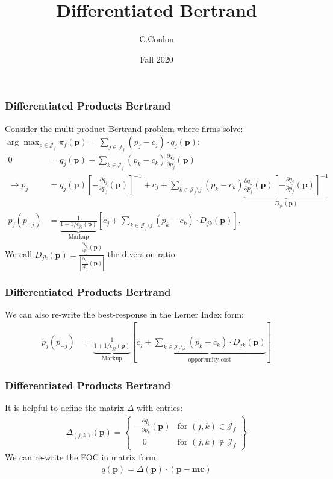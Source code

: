 \documentclass[xcolor=pdftex,dvipsnames,table,mathserif,aspectratio=169]{beamer}
\title{Differentiated Bertrand}
\author{C.Conlon}
\institute{Grad IO }
\date{Fall 2020}
\begin{document}
\frame{\titlepage}

\begin{frame}
\frametitle{Differentiated Products Bertrand}
\small
Consider the multi-product Bertrand problem where firms solve: $\arg \max_{p \in \mathcal{J}_f} \pi_f (\mathbf{p}) = \sum_{j \in \mathcal{J}_f} (p_j - c_j) \cdot q_j(\mathbf{p})$:
\begin{align*}
 0&= q_j(\mathbf{p}) + \sum_{k \in \mathcal{J}_f} (p_k - c_k) \frac{\partial q_{k}}{\partial p_j}(\mathbf{p}) \\
\rightarrow p_j &=q_{j}(\mathbf{p}) \left[-\frac{\partial q_{j}}{\partial p_{j}}(\mathbf{p})\right]^{-1} + c_{j} + \sum_{k \in \mathcal{J}_{f} \setminus j} \left(p_{k}-c_{k}\right) \underbrace{\frac{\partial q_{k}}{\partial p_{j}}(\mathbf{p})\left[-\frac{\partial q_{j}}{\partial p_{j}}(\mathbf{p})\right]^{-1}}_{D_{jk}(\mathbf{p})}\\
p_j(p_{-j}) &= \underbrace{\frac{1}{1+1/\epsilon_{jj}(\mathbf{p})}}_{\text{Markup}} \left[ c_j + \sum_{k \in \mathcal{J}_{f} \setminus j}  (p_k-c_k) \cdot  D_{jk} (\mathbf{p}) \right].
\end{align*}
We call $D_{jk}(\mathbf{p}) = \frac{\frac{\partial q_{k}}{\partial p_j}(\mathbf{p})}{\left| \frac{\partial q_{j}}{\partial p_j}(\mathbf{p}) \right|}$ the \alert{diversion ratio}.
\end{frame}

\begin{frame}
\frametitle{Differentiated Products Bertrand}
We can also re-write the best-response in the Lerner Index form:
\begin{align*}
p_j(p_{-j}) &= \underbrace{\frac{1}{1+1/\epsilon_{jj}(\mathbf{p})}}_{\text{Markup}} \left[c_j + \underbrace{\sum_{k \in \mathcal{J}_{f} \setminus j}  (p_k-c_k) \cdot  D_{jk} (\mathbf{p}) }_{\text{opportunity cost}}\right]
\end{align*}

\end{frame}


\begin{frame}
\frametitle{Differentiated Products Bertrand}
It is helpful to define the matrix $\Delta$ with entries:
\begin{eqnarray*}
\Delta_{(j,k)}(\mathbf{p}) = \left\{\begin{array}{lr}
         - \frac{\partial q_{j}}{\partial p_k}(\mathbf{p}) & \text{for }  (j,k) \in \mathcal{J}_f\\
       	  \quad 0 & \text{for } (j,k) \notin \mathcal{J}_f
        \end{array} \right\}
\end{eqnarray*}
We can re-write the FOC in matrix form:
\begin{eqnarray*}
q(\mathbf{p}) = \Delta(\mathbf{p})\cdot(\mathbf{p}-\mathbf{mc})
\end{eqnarray*}
\end{frame}
\end{document}
